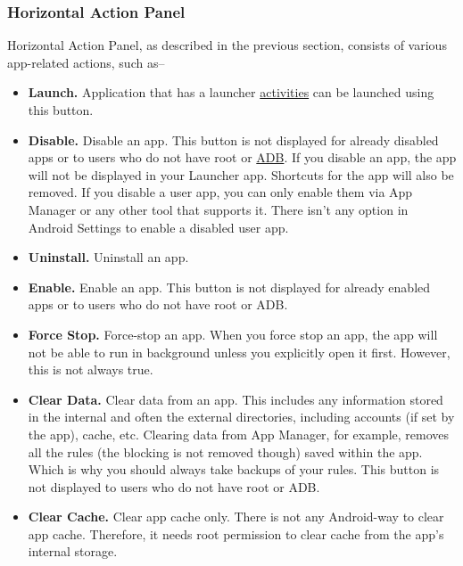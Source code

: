 \subsubsection{Horizontal Action Panel}\label{subsubsec:horizontal-action-panel}
Horizontal Action Panel, as described in the previous section, consists of various app-related actions, such as--
\begin{itemize}
    \item \textbf{Launch.} Application that has a launcher \hyperref[subsubsec:activities]{activities} can be launched
    using this button.

    \item \textbf{Disable.} Disable an app. This button is not displayed for already disabled apps or to users who do
    not have root or \hyperref[sec:adb-over-tcp]{ADB}. If you disable an app, the app will not be displayed in your
    Launcher app. Shortcuts for the app will also be removed. If you disable a user app, you can only enable them via
    App Manager or any other tool that supports it. There isn't any option in Android Settings to enable a disabled user
    app.

    \item \textbf{Uninstall.} Uninstall an app.

    \item \textbf{Enable.} Enable an app. This button is not displayed for already enabled apps or to users who do not
    have root or ADB\@.

    \item \textbf{Force Stop.} Force-stop an app. When you force stop an app, the app will not be able to run in
    background unless you explicitly open it first. However, this is not always true.

    \item \textbf{Clear Data.} Clear data from an app. This includes any information stored in the internal and often
    the external directories, including accounts (if set by the app), cache, etc. Clearing data from App Manager, for
    example, removes all the rules (the blocking is not removed though) saved within the app. Which is why you should
    always take backups of your rules. This button is not displayed to users who do not have root or ADB\@.

    \item \textbf{Clear Cache.} Clear app cache only. There is not any Android-way to clear app cache. Therefore, it
    needs root permission to clear cache from the app's internal storage.


\end{itemize}

